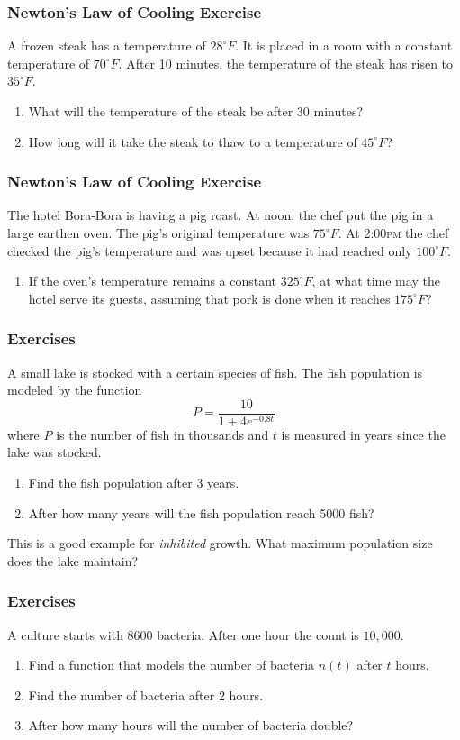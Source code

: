 \documentclass[xcolor=dvipsnames]{beamer}
\begin{document}
\begin{frame}
  \frametitle{Newton's Law of Cooling Exercise}
{\ubung} A frozen steak has a temperature of $28^{\circ}F$. It is placed in a
room with a constant temperature of $70^{\circ}F$. After 10 minutes,
the temperature of the steak has risen to $35^{\circ}F$. 
\begin{enumerate}
\item<1-> What will the temperature of the steak be after 30 minutes?
\item<2-> How long will it take the steak to thaw to a temperature of $45^{\circ}F$?
\end{enumerate}
\end{frame}

\begin{frame}
  \frametitle{Newton's Law of Cooling Exercise}
{\ubung} The hotel Bora-Bora is having a pig roast. At noon, the chef put the
pig in a large earthen oven. The pig's original temperature was
$75^{\circ}F$. At 2:00\textsc{pm} the chef checked the pig's
temperature and was upset because it had reached only $100^{\circ}F$.
\begin{enumerate}
\item If the oven's temperature remains a constant $325^{\circ}F$, at
  what time may the hotel serve its guests, assuming that pork is done
  when it reaches $175^{\circ}F$?
\end{enumerate}
\end{frame}

\begin{frame}
  \frametitle{Exercises}
{\ubung}  A small lake is stocked with a certain species of fish. The fish
  population is modeled by the function
  \begin{equation}
    \label{eq:peongeex}
    P=\frac{10}{1+4e^{-0.8t}}
  \end{equation}
where $P$ is the number of fish in thousands and $t$ is measured in
years since the lake was stocked.
\begin{enumerate}
\item Find the fish population after 3 years.
\item After how many years will the fish population reach 5000 fish?
\end{enumerate}
This is a good example for \emph{inhibited} growth. What maximum
population size does the lake maintain?
\end{frame}

\begin{frame}
  \frametitle{Exercises}
  {\ubung} A culture starts with 8600 bacteria. After one hour the
  count is $10,000$.
\begin{enumerate}
\item Find a function that models the number of bacteria $n(t)$ after $t$ hours.
\item Find the number of bacteria after 2 hours.
\item After how many hours will the number of bacteria double?
\end{enumerate}
\end{frame}
\end{document}
